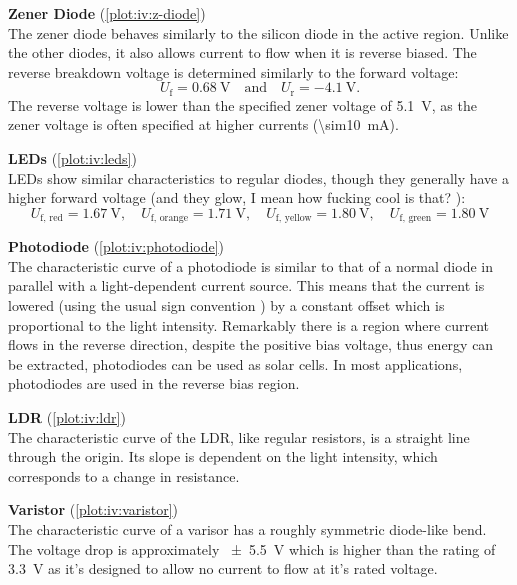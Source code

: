 \textbf{Zener Diode} (\autoref{plot:iv:z-diode})\\
The zener diode behaves similarly to the silicon diode in the active region.
Unlike the other diodes, it also allows current to flow when it is reverse biased.
The reverse breakdown voltage is determined similarly to the forward voltage:
\begin{equation*}
	U_\text{f} = \SI{0.68}{\volt} \quad \text{and} \quad U_\text{r} = \SI{-4.1}{\volt}.
\end{equation*}
The reverse voltage is lower than the specified zener voltage of \SI{5.1}{\volt}, as the zener voltage is often specified at higher currents (\SI{\sim10}{\mA}).

\textbf{LEDs} (\autoref{plot:iv:leds})\\
LEDs show similar characteristics to regular diodes, though they generally have a higher forward voltage (and they glow, I mean how fucking cool is that? ):
\begin{equation*}
	U_\text{f, red} = \SI{1.67}{\volt}, \quad U_\text{f, orange} = \SI{1.71}{\volt}, \quad U_\text{f, yellow} = \SI{1.80}{\volt}, \quad U_\text{f, green} = \SI{1.80}{\volt}
\end{equation*}

\textbf{Photodiode} (\autoref{plot:iv:photodiode})\\
The characteristic curve of a photodiode is similar to that of a normal diode in parallel with a light-dependent current source.
This means that the current is lowered (using the usual sign convention ) by a constant offset which is proportional to the light intensity.
Remarkably there is a region where current flows in the reverse direction, despite the positive bias voltage, thus energy can be extracted, photodiodes can be used as solar cells.
In most applications, photodiodes are used in the reverse bias region.

\textbf{LDR} (\autoref{plot:iv:ldr})\\
The characteristic curve of the LDR, like regular resistors, is a straight line through the origin.
Its slope is dependent on the light intensity, which corresponds to a change in resistance.

\textbf{Varistor} (\autoref{plot:iv:varistor})\\
The characteristic curve of a varisor has a roughly symmetric diode-like bend.
The voltage drop is approximately \SI{\pm 5.5}{\volt} which is higher than the rating of \SI{3.3}{\volt} as it's designed to allow no current to flow at it's rated voltage.

